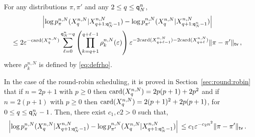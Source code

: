 \begin{lemma}
For any distributions $\pi,\pi'$ and any $2\le q\le {\mathsf{q}}^{n}_{N}$,
\begin{multline*}
\left|\log p_{\pi}^{n,N}(X_{q}^{n,N}|X_{q+1:{\mathsf{q}}^{n}_{N}-1}^{n,N}) - \log p_{\pi'}^{n,N}(X_{q}^{n,N}|X_{q+1:{\mathsf{q}}^{n}_{N}-1}^{n,N})\right| \\
\leq 2\varepsilon^{-\mathrm{card}(X^{n,N}_{q})}\sum_{\ell= 0}^{{\mathsf{q}}^{n}_{N}-q}\left(\prod_{k = q+1}^{q+\ell-1}\rho^{n,N}_k(\varepsilon)\right)\varepsilon^{-2\mathrm{card}(X^{n,N}_{q+\ell-1})-2\mathrm{card}(X^{n,N}_{q+\ell})}\|\pi-\pi'\|_{\mathsf{tv}}\,,
\end{multline*}
where $\rho^{n,N}_k$ is defined by \eqref{eq:defrho}.
\end{lemma}
\begin{remark}
\label{rem:forgetting:tv}
In the case of the round-robin scheduling, it is proved in Section~\ref{sec:round:robin} that if  $n = 2p+1$ with $p\ge 0$ then $\mathrm{card}(X^{n,N}_{q}) = 2p(p+1) + 2p^2$ and  if  $n = 2(p+1)$ with $p\ge 0$ then $\mathrm{card}(X^{n,N}_{q}) = 2(p+1)^2 + 2p(p+1)$, for $0 \le q\le {\mathsf{q}}^{n}_{N}-1$. Then, there exist $c_1,c2 >0$ such that,
\[
\left|\log p_{\pi}^{n,N}(X_{q}^{n,N}|X_{q+1:{\mathsf{q}}^{n}_{N}-1}^{n,N}) - \log p_{\pi'}^{n,N}(X_{q}^{n,N}|X_{q+1:{\mathsf{q}}^{n}_{N}-1}^{n,N})\right| \\
\leq c_1\varepsilon^{-c_2n^2}\|\pi-\pi'\|_{\mathsf{tv}}\,.
\]
\end{remark}
